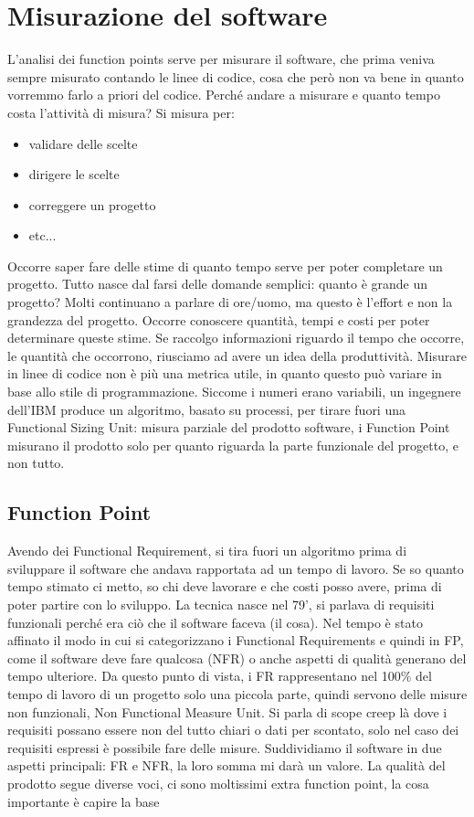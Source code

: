 \documentclass{article}
\begin{document}
\section{Misurazione del software}
L'analisi dei function points serve per misurare il software, che prima veniva sempre misurato contando le linee di codice, cosa che però non va bene in quanto vorremmo farlo a priori del codice. Perché andare a misurare e quanto tempo costa l'attività di misura? Si misura per:
\begin{itemize}
\item validare delle scelte
\item dirigere le scelte
\item correggere un progetto
\item etc...
\end{itemize}
Occorre saper fare delle stime di quanto tempo serve per poter completare un progetto. Tutto nasce dal farsi delle domande semplici: quanto è grande un progetto? Molti continuano a parlare di ore/uomo, ma questo è l'effort e non la grandezza del progetto. Occorre conoscere quantità, tempi e costi per poter determinare queste stime. Se raccolgo informazioni riguardo il tempo che occorre, le quantità che occorrono, riusciamo ad avere un idea della produttività. Misurare in linee di codice non è più una metrica utile, in quanto questo può variare in base allo stile di programmazione. Siccome i numeri erano variabili, un ingegnere dell'IBM produce un algoritmo, basato su processi, per tirare fuori una Functional Sizing Unit: misura parziale del prodotto software, i Function Point misurano il prodotto solo per quanto riguarda la parte funzionale del progetto, e non tutto.
\subsection{Function Point}
Avendo dei Functional Requirement, si tira fuori un algoritmo prima di sviluppare il software che andava rapportata ad un tempo di lavoro. Se so quanto tempo stimato ci metto, so chi deve lavorare e che costi posso avere, prima di poter partire con lo sviluppo. La tecnica nasce nel 79', si parlava di requisiti funzionali perché era ciò che il software faceva (il cosa). Nel tempo è stato affinato il modo in cui si categorizzano i Functional Requirements e quindi in FP, come il software deve fare qualcosa (NFR) o anche aspetti di qualità generano del tempo ulteriore. Da questo punto di vista, i FR rappresentano nel 100\% del tempo di lavoro di un progetto solo una piccola parte, quindi servono delle misure non funzionali, Non Functional Measure Unit. Si parla di scope creep là dove i requisiti possano essere non del tutto chiari o dati per scontato, solo nel caso dei requisiti espressi è possibile fare delle misure. Suddividiamo il software in due aspetti principali: FR e NFR, la loro somma mi darà un valore. La qualità del prodotto segue diverse voci, ci sono moltissimi extra function point, la cosa importante è capire la base
\end{document}
